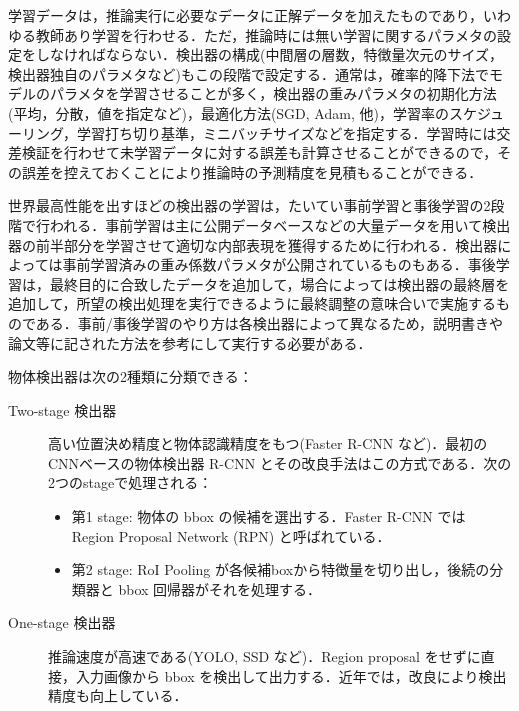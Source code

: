 \documentclass[originalpaper,fleqn]{jsaiart}     %
\begin{document}
学習データは，推論実行に必要なデータに正解データを加えたものであり，いわゆる教師あり学習を行わせる．ただ，推論時には無い学習に関するパラメタの設定をしなければならない．検出器の構成(中間層の層数，特徴量次元のサイズ，検出器独自のパラメタなど)もこの段階で設定する．通常は，確率的降下法でモデルのパラメタを学習させることが多く，検出器の重みパラメタの初期化方法(平均，分散，値を指定など)，最適化方法(SGD, Adam, 他)，学習率のスケジューリング，学習打ち切り基準，ミニバッチサイズなどを指定する．学習時には交差検証を行わせて未学習データに対する誤差も計算させることができるので，その誤差を控えておくことにより推論時の予測精度を見積もることができる．

世界最高性能を出すほどの検出器の学習は，たいてい事前学習と事後学習の2段階で行われる．事前学習は主に公開データベースなどの大量データを用いて検出器の前半部分を学習させて適切な内部表現を獲得するために行われる．検出器によっては事前学習済みの重み係数パラメタが公開されているものもある．事後学習は，最終目的に合致したデータを追加して，場合によっては検出器の最終層を追加して，所望の検出処理を実行できるように最終調整の意味合いで実施するものである．事前/事後学習のやり方は各検出器によって異なるため，説明書きや論文等に記された方法を参考にして実行する必要がある．

物体検出器は次の2種類に分類できる\cite{JZLYLFQ19}：
\begin{description}
    \item[Two-stage 検出器] 高い位置決め精度と物体認識精度をもつ(Faster R-CNN など)．最初のCNNベースの物体検出器 R-CNN とその改良手法はこの方式である．次の2つのstageで処理される：
    \begin{itemize}
        \item 第1 stage: 物体の bbox の候補を選出する．Faster R-CNN では Region Proposal Network (RPN) と呼ばれている．
        \item 第2 stage: RoI Pooling が各候補boxから特徴量を切り出し，後続の分類器と bbox 回帰器がそれを処理する．
    \end{itemize}
    \item[One-stage 検出器] 推論速度が高速である(YOLO, SSD など)．Region proposal をせずに直接，入力画像から bbox を検出して出力する．近年では，改良により検出精度も向上している．
\end{description}
\end{document}
